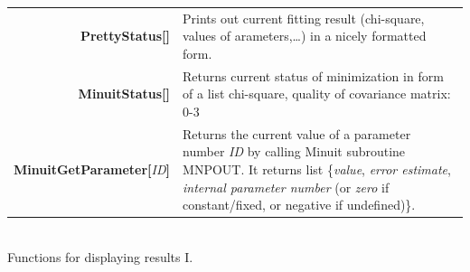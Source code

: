 \documentclass[12pt]{article}
\newcommand{\defboxitem}[3]{ {\ttfamily \bfseries #1[}\emph{#2}{\ttfamily \bfseries ]} & #3 }
\begin{document}
\begin{flushleft}
\colorbox{defbox}{%
\begin{minipage}{\textwidth}%
\begin{tabular}{rp{8cm}}%
\defboxitem{PrettyStatus}{}{Prints out current fitting result (chi-square, values of
arameters,\ldots) in a nicely formatted form.} \\[0.8ex]
\defboxitem{MinuitStatus}{}{Returns current status of minimization in form of a 
list {chi-square, quality of covariance matrix: 0-3}} \\[0.8ex]
\defboxitem{MinuitGetParameter}{ID}{Returns the current value of a parameter
number \emph{ID} by calling Minuit subroutine MNPOUT. It returns list 
\{\emph{value}, \emph{error estimate}, \emph{internal parameter number} (or \emph{zero} if
constant/fixed, or negative if undefined)\}. } \\[0.8ex]
\end{tabular}%
\end{minipage}}\\[0.5ex]
{\small Functions for displaying results I.}
\end{flushleft}
\end{document}
